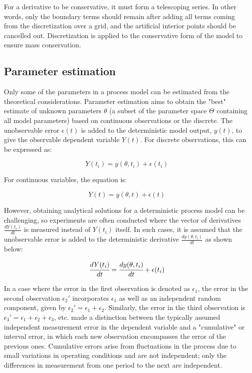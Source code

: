 \documentclass[a4paper,fleqn]{cas-dc}
\begin{document}
		For a derivative to be conservative, it must form a telescoping series. In other words, only the boundary terms should remain after adding all terms coming from the discretization over a grid, and the artificial interior points should be cancelled out. Discretization is applied to the conservative form of the model to ensure mass conservation.

\subsection{Parameter estimation} \label{CH: Parameter_estimation}

Only some of the parameters in a process model can be estimated from the theoretical considerations. Parameter estimation aims to obtain the "best" estimate of unknown parameters $\theta$ (a subset of the parameter space $\Theta$ containing all model parameters) based on continuous observations or the discrete. The unobservable error $\epsilon(t)$ is added to the deterministic model output, $y(t)$, to give the observable dependent variable $Y(t)$. For discrete observations, this can be expressed as:

{\footnotesize
	\begin{equation*}
		Y(t_i) = y(\theta, t_i) + \epsilon(t_i)
\end{equation*} }

For continuous variables, the equation is:

{\footnotesize
	\begin{equation*}
		Y(t) = y(\theta, t) + \epsilon(t)
\end{equation*} }

However, obtaining analytical solutions for a deterministic process model can be challenging, so experiments are often conducted where the vector of derivatives $\frac{dY(t_i)}{dt}$ is measured instead of $Y(t_i)$ itself. In such cases, it is assumed that the unobservable error is added to the deterministic derivative $\frac{dy(\theta, t_i)}{dt}$ as shown below:

{\footnotesize
	\begin{equation}  \label{EQ: Measurment_noise}
		\cfrac{d Y(t_i)}{dt} = \cfrac{dy(\theta, t_i)}{dt} + \epsilon(t_i)
\end{equation} }

In a case where the error in the first observation is denoted as $\epsilon_1$, the error in the second observation $\epsilon_2'$ incorporates $\epsilon_1$ as well as an independent random component, given by $\epsilon_2' = \epsilon_1 + \epsilon_2$. Similarly, the error in the third observation is $\epsilon_3' = \epsilon_1 + \epsilon_2 + \epsilon_3$, etc. \citet{Mandel1957}  made a distinction between the typically assumed independent measurement error in the dependent variable and a "cumulative" or interval error, in which each new observation encompasses the error of the previous ones. Cumulative errors arise from fluctuations in the process due to small variations in operating conditions and are not independent; only the differences in measurement from one period to the next are independent.
\end{document}
